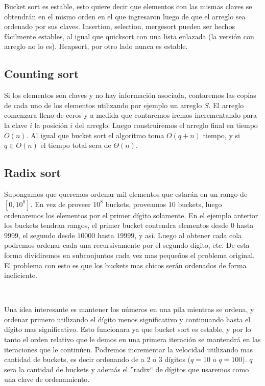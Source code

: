 
Bucket sort es estable, esto quiere decir que elementos con las mismas claves se obtendr\'an en el mismo orden en el que ingresaron luego de que el arreglo sea ordenado por sus claves. Insertion, selection, mergesort pueden ser hechos f\'acilmente estables, al igual que quicksort con una lista enlazada (la versi\'on con arreglo no lo es). Heapsort, por otro lado nunca es estable.

\subsection{Counting sort}

Si los elementos son claves y no hay informaci\'on asociada, contaremos las copias de cada uno de los elementos utilizando por ejemplo un arreglo $S$. El arreglo comenzara lleno de ceros y a medida que contaremos iremos incrementando para la clave $i$ la posici\'on $i$ del arreglo. Luego construiremos el arreglo final en tiempo $O(n)$. Al igual que bucket sort el algoritmo toma $O(q+n)$ tiempo, y si $q \in O(n)$ el tiempo total sera de $\Theta(n)$.

\subsection{Radix sort}

Supongamos que queremos ordenar mil elementos que estar\'an en un rango de $[0, 10^8]$. En vez de proveer $10^8$ buckets, proveamos $10$ buckets, luego ordenaremos los elementos por el primer d\'igito solamente. En el ejemplo anterior los buckets tendran rangos, el primer bucket  contendra elementos desde $0$ hasta $9999$, el segundo desde $10000$ hasta $19999$, y asi. Luego al obtener cada cola podremos ordenar cada una recursivamente por el segundo d\'igito, etc. De esta forma dividiremos en subconjuntos cada vez mas peque\~nos el problema original. El problema con esto es que los buckets mas chicos ser\'an ordenados de forma ineficiente.

~

Una idea interesante es mantener los n\'umeros en una pila mientras se ordena, y ordenar primero utilizando el d\'igito menos significativo y continuando hasta el d\'igito mas significativo. Esto funcionara ya que bucket sort es estable, y por lo tanto el orden relativo que le demos en una primera iteraci\'on se mantendr\'a en las iteraciones que le contin\'uen. Podremos incrementar la velocidad utilizando mas cantidad de buckets, es decir ordenando de a 2 o 3 d\'igitos ($q=10$ o $q=100$). $q$ sera la cantidad de buckets y adem\'as el ''radix`` de d\'igitos que usaremos como una clave de ordenamiento.

